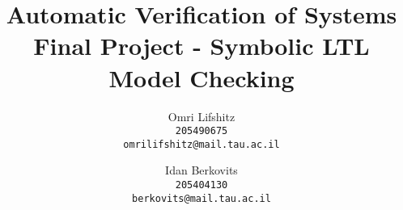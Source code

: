 \documentclass[11pt]{article}
\begin{document}
\setlength{\oddsidemargin}{.25in}
\setlength{\evensidemargin}{.25in}
\setlength{\textwidth}{6in}
\setlength{\topmargin}{-0.4in}
\setlength{\textheight}{8.5in}

\newcommand{\handout}[4]{
   \noindent
   \begin{center}
   \framebox{
      \vbox{
    \hbox to 5.78in { {\bf Automatic Verification of Systems} \hfill #1 }
       \vspace{4mm}
       \hbox to 5.78in { {\Large \hfill #4  \hfill} }
       \vspace{2mm}
       \hbox to 5.78in { {\it #2 \hfill #3} }
      }
   }
   \end{center}
   \vspace*{4mm}
}

\newcommand{\finalProjTitle}[4]{\handout{#1}{Lecturer:
#2}{Names: #3}{#4}}

\newtheorem{theorem}{Theorem}
\newtheorem{corollary}[theorem]{Corollary}
\newtheorem{lemma}[theorem]{Lemma}
\newtheorem{observation}[theorem]{Observation}
\newtheorem{proposition}[theorem]{Proposition}
\newtheorem{definition}[theorem]{Definition}
\newtheorem{claim}[theorem]{Claim}
\newtheorem{fact}[theorem]{Fact}
\newtheorem{assumption}[theorem]{Assumption}
\newtheorem{example}{Example}

\newcommand{\qed}{\rule{7pt}{7pt}}

\newenvironment{proof}{\noindent{\bf Proof:}\hspace*{1em}}{\qed\bigskip}
\newenvironment{proof-sketch}{\noindent{\bf Sketch of Proof:}\hspace*{1em}}{\qed\bigskip}
\newenvironment{proof-idea}{\noindent{\bf Proof Idea:}\hspace*{1em}}{\qed\bigskip}
\newenvironment{proof-of-lemma}[1]{\noindent{\bf Proof of Lemma #1:}\hspace*{1em}}{\qed\bigskip}
\newenvironment{proof-attempt}{\noindent{\bf Proof Attempt:}\hspace*{1em}}{\qed\bigskip}
\newenvironment{proofof}[1]{\noindent{\bf Proof}
of #1:\hspace*{1em}}{\qed\bigskip}
\newenvironment{remark}{\noindent{\bf Remark}\hspace*{1em}}{\bigskip}


\title{\vspace{-2.0cm}\textbf{Automatic Verification of Systems \\ Final Project - 
Symbolic LTL Model Checking}}
\author{
	Omri Lifshitz \\
	\texttt{205490675} \\
	\texttt{omrilifshitz@mail.tau.ac.il}
	\and 
	Idan Berkovits \\
	\texttt{205404130} \\
	\texttt{berkovits@mail.tau.ac.il}
}
\date{}
\end{document}
